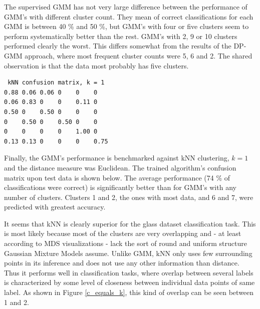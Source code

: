 \documentclass[a4paper]{article}
\begin{document}
\par
The supervised GMM has not very large difference between the performance of
GMM's with different cluster count. They mean of correct classifications for
each GMM is between 40 \% and 50 \%, but GMM's with four or five clusters seem
to perform systematically better than the rest. GMM's with 2, 9 or 10 clusters
performed clearly the worst. This differs somewhat from the results of the
DP-GMM approach, where most frequent cluster counts were 5, 6 and 2. The shared
observation is that the data most probably has five clusters.

\begin{verbatim}
 kNN confusion matrix, k = 1
0.88 0.06 0.06 0    0    0   
0.06 0.83 0    0    0.11 0   
0.50 0    0.50 0    0    0   
0    0.50 0    0.50 0    0   
0    0    0    0    1.00 0   
0.13 0.13 0    0    0    0.75
\end{verbatim}

\par
Finally, the GMM's performance is benchmarked against kNN clustering, $ k = 1 $
and the distance measure was Euclidean. The trained algorithm's confusion
matrix upon test data is shown below. The average performance (74 \% of
classifications were correct) is significantly better than for GMM's with any
number of clusters. Clusters 1 and 2, the ones with most data, and 6 and 7,
were predicted with greatest accuracy. 

\par
It seems that kNN is clearly superior for the glass dataset classification task. This is most likely because most of the clusters are very overlapping and - at least according to MDS visualizations - lack the sort of round and uniform structure Gaussian Mixture Models assume. Unlike GMM, kNN only uses few surrounding points in its inference and does not use any other information than distance. Thus it performs well in classification tasks, where overlap between several labels is characterized by some level of closeness between individual data points of same label. As shown in Figure \ref{c_equals_k}, this kind of overlap can be seen between 1 and 2. 


\end{document}
